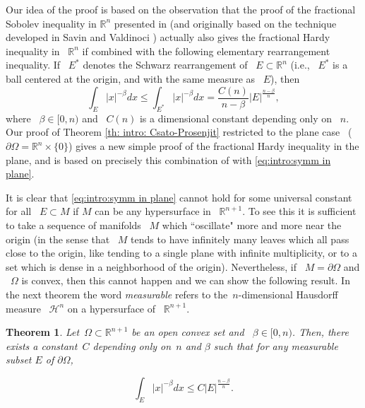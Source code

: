 \documentclass[reqno,12pt]{amsart}
\newcommand{\R}{\mathbb{R}}
\newcommand{\delomega}{\partial\Omega}
\numberwithin{equation}{section}
\theoremstyle{plain}
\newtheorem{theorem}[definition]{Theorem}
\theoremstyle{definition}
\renewcommand{\leq}{\leqslant}
\begin{document}
  
Our idea of the proof is based on the observation that the proof of the fractional Sobolev inequality in $\R^n$ presented in \cite{HitchhikersG} (and originally based on the technique developed in Savin and Valdinoci \cite{Savin-Valdinoci1,Savin-Valdinoci2}) actually also gives the fractional Hardy inequality in ~$\R^n$ if combined with the following elementary rearrangement inequality. If ~$E^*$ denotes the Schwarz rearrangement of ~$E\subset\R^{n}$ (i.e., ~$E^*$ is a ball centered at the origin, and with the same measure as ~$E$), then
\begin{equation}
 \label{eq:intro:symm in plane}
  \int_{E}|x|^{-\beta}dx \leq \int_{E^*}|x|^{-\beta}dx= \frac{C(n)}{n-\beta} |E|^{\frac{n-\beta}{n}},
\end{equation} 
where ~$\beta\in[0,n)$ and ~$C(n)$ is a dimensional constant depending only on ~$n.$ Our proof of Theorem \ref{th: intro: Csato-Prosenjit} restricted to the plane case ~($\partial\Omega=\R^n\times\{0\}$) gives a new simple proof of the fractional Hardy inequality in the plane, and is based on precisely this combination of \cite[Section 6]{HitchhikersG} with \eqref{eq:intro:symm in plane}. 

It is clear that \eqref{eq:intro:symm in plane} cannot hold for some universal constant for all ~$E\subset M$  if $M$ can be any hypersurface in ~$\R^{n+1}$. To see this it is sufficient to take a sequence of manifolds ~$M$ which ``oscillate" more and more near the origin (in the sense that ~$M$ tends to have infinitely many leaves which all pass close to the origin, like tending to a single plane with infinite multiplicity, or to a set which is dense in a neighborhood of the origin). Nevertheless, if ~$M=\partial\Omega$ and ~$\Omega$ is convex, then this cannot happen and we can show the following result. In the next theorem the word \emph{measurable} refers to the~$n$-dimensional Hausdorff measure ~$\mathcal{H}^n$ on a hypersurface of ~$\R^{n+1}.$


\begin{theorem}
    \label{th:intro:key theorem}
     Let~$\Omega\subset\R^{n+1}$ be an open convex set and ~$\beta \in [0,n)$. Then, there exists a constant~$C$ depending only on~$n$ and $\beta$  such that for any measurable subset $E$ of $\delomega$,

     \begin{equation}
         \label{eq:intro: main estimate}
\int_{E}|x|^{-\beta}dx \leq C |E|^{\frac{n-\beta}{n}}.
     \end{equation}
\end{theorem}
\end{document}
